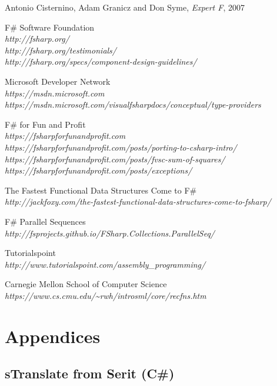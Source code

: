 \documentclass[12pt, a4paper]{article}
\begin{document}
\begin{thebibliography}{9}

Antonio Cisternino, Adam Granicz and Don Syme,
\textit{Expert F}, 
2007

F\# Software Foundation\\
\emph{http://fsharp.org/}\\
\emph{http://fsharp.org/testimonials/}\\
\emph{http://fsharp.org/specs/component-design-guidelines/}

Microsoft Developer Network\\
\emph{https://msdn.microsoft.com}\\
\emph{https://msdn.microsoft.com/visualfsharpdocs/conceptual/type-providers}

F\# for Fun and Profit\\
\emph{https://fsharpforfunandprofit.com}\\
\emph{https://fsharpforfunandprofit.com/posts/porting-to-csharp-intro/}\\
\emph{https://fsharpforfunandprofit.com/posts/fvsc-sum-of-squares/}\\
\emph{https://fsharpforfunandprofit.com/posts/exceptions/}

The Fastest Functional Data Structures Come to F\#\\
\emph{http://jackfoxy.com/the-fastest-functional-data-structures-come-to-fsharp/}

F\# Parallel Sequences\\
\emph{http://fsprojects.github.io/FSharp.Collections.ParallelSeq/}

Tutorialspoint\\
\emph{http://www.tutorialspoint.com/assembly\_programming/}

Carnegie Mellon School of Computer Science\\
\emph{https://www.cs.cmu.edu/\textasciitilde rwh/introsml/core/recfns.htm}

\end{thebibliography}
\newpage

\appendix
\footnotesize
\section{Appendices}	
\subsection{sTranslate from Serit (C\#)}
\label{AppendixCSharp}
\end{document}
